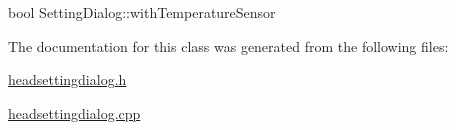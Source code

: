 \mbox{\label{classSettingDialog_a92ac83de20616f1f67f369dec0afe5f0}} 
{\footnotesize\ttfamily bool Setting\+Dialog\+::\texorpdfstring{with\+Temperature\+Sensor}{withTemperatureSensor}\hspace{0.3cm}{\ttfamily [private]}}



The documentation for this class was generated from the following files\+:\begin{DoxyCompactItemize}
\item 
\mbox{\hyperlink{headsettingdialog_8h}{headsettingdialog.\+h}}\item 
\mbox{\hyperlink{headsettingdialog_8cpp}{headsettingdialog.\+cpp}}\end{DoxyCompactItemize}
\newpage